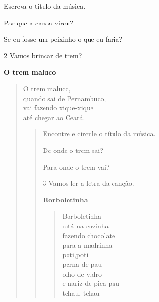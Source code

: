 \begin{escolha}
\item Escreva o título da música.


\item Por que a canoa virou?


\item Se eu fosse um peixinho o que eu faria?

\begin{escolha}

\num{2} Vamos brincar de trem?


\textbf{O trem maluco}

\begin{verse}
O trem maluco,\\
quando sai de Pernambuco,\\
vai fazendo xique-xique\\
até chegar ao Ceará.
\begin{verse}

\begin{escolha}
\item  Encontre e circule o título da música.

\item De onde o trem sai?


\item Para onde o trem vai?

\end{escolha}

\num{3} Vamos ler a letra da canção.


\textbf{Borboletinha}

\begin{verse}
Borboletinha\\
está na cozinha\\
fazendo chocolate\\
para a madrinha\\
poti,poti\\
perna de pau\\
olho de vidro\\
e nariz de pica-pau\\
tchau, tchau
\end{verse}


\end{verse}
\end{verse}
\end{escolha}
\end{escolha}
